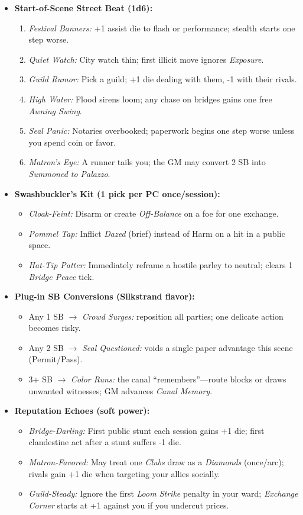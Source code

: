 \begin{itemize}
  \item \textbf{Start-of-Scene Street Beat (1d6):}
  \begin{enumerate}
    \item \emph{Festival Banners:} +1 assist die to flash or performance; stealth starts one step worse.
    \item \emph{Quiet Watch:} City watch thin; first illicit move ignores \emph{Exposure}.
    \item \emph{Guild Rumor:} Pick a guild; +1 die dealing with them, -1 with their rivals.
    \item \emph{High Water:} Flood sirens loom; any chase on bridges gains one free \emph{Awning Swing}.
    \item \emph{Seal Panic:} Notaries overbooked; paperwork begins one step worse unless you spend coin or favor.
    \item \emph{Matron’s Eye:} A runner tails you; the GM may convert 2 SB into \emph{Summoned to Palazzo}.
  \end{enumerate}

  \item \textbf{Swashbuckler’s Kit (1 pick per PC once/session):}
  \begin{itemize}
    \item \emph{Cloak-Feint:} Disarm or create \emph{Off-Balance} on a foe for one exchange.
    \item \emph{Pommel Tap:} Inflict \emph{Dazed} (brief) instead of Harm on a hit in a public space.
    \item \emph{Hat-Tip Patter:} Immediately reframe a hostile parley to neutral; clears 1 \emph{Bridge Peace} tick.
  \end{itemize}

  \item \textbf{Plug-in SB Conversions (Silkstrand flavor):}
  \begin{itemize}
    \item Any 1 SB \(\rightarrow\) \emph{Crowd Surges:} reposition all parties; one delicate action becomes risky.
    \item Any 2 SB \(\rightarrow\) \emph{Seal Questioned:} voids a single paper advantage this scene (Permit/Pass).
    \item 3+ SB \(\rightarrow\) \emph{Color Runs:} the canal “remembers”—route blocks or draws unwanted witnesses; GM advances \emph{Canal Memory}.
  \end{itemize}

  \item \textbf{Reputation Echoes (soft power):}
  \begin{itemize}
    \item \emph{Bridge-Darling:} First public stunt each session gains +1 die; first clandestine act after a stunt suffers -1 die.
    \item \emph{Matron-Favored:} May treat one \emph{Clubs} draw as a \emph{Diamonds} (once/arc); rivals gain +1 die when targeting your allies socially.
    \item \emph{Guild-Steady:} Ignore the first \emph{Loom Strike} penalty in your ward; \emph{Exchange Corner} starts at +1 against you if you undercut prices.
  \end{itemize}
\end{itemize}
